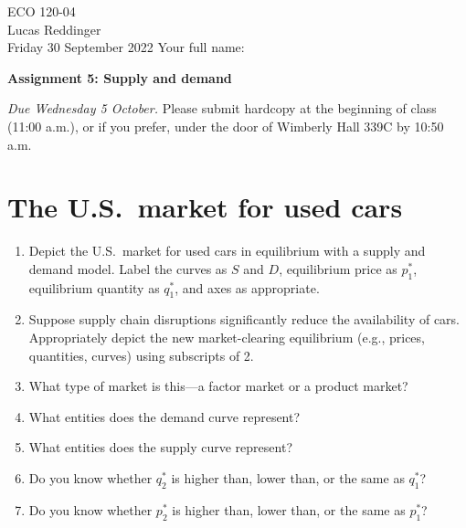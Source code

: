\documentclass[
    letterpaper,paper=portrait,fleqn,
    DIV=16,fontsize=12pt,twoside=semi,
    parskip=full-,
    headings=standardclasses]
{scrartcl}
\begin{document}
\RaggedRight
\thispagestyle{plain}

ECO 120-04 \\
Lucas Reddinger \\
Friday 30 September 2022 \hfill Your full name: \underline{\hspace{3.25in}}

\vspace{0.7\baselineskip}
\textbf{\LARGE Assignment 5: Supply and demand}
\vspace{0.3\baselineskip}

\emph{Due Wednesday 5 October.} Please submit hardcopy at the beginning of class (11:00 a.m.), or if you prefer, under the door of Wimberly Hall 339C by 10:50 a.m.

\section{The U.S.~market for used cars}

\begin{center}
\vspace{18pt}
\end{center}

\begin{enumerate}

\item Depict the U.S.~market for used cars in equilibrium with a supply and demand model. Label the curves as $S$ and $D$, equilibrium price as $p^*_1$, equilibrium quantity as $q^*_1$, and axes as appropriate.

\item Suppose supply chain disruptions significantly reduce the availability of cars. Appropriately depict the new market-clearing equilibrium (e.g., prices, quantities, curves) using subscripts of 2.

\item What type of market is this---a factor market or a product market?

\vfill

\item What entities does the demand curve represent?

\vfill

\vspace{-1\baselineskip}
\clearpage

\item What entities does the supply curve represent?

\vfill

\item Do you know whether $q^*_2$ is higher than, lower than, or the same as $q^*_1$?

\vfill

\item Do you know whether $p^*_2$ is higher than, lower than, or the same as $p^*_1$?

\vfill

\end{enumerate}
\end{document}
